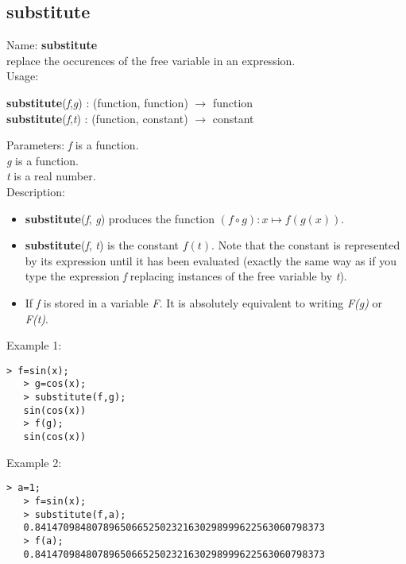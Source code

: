 \subsection{ substitute }
\noindent Name: \textbf{substitute}\\
replace the occurences of the free variable in an expression.\\

\noindent Usage: 
\begin{center}
\textbf{substitute}(\emph{f},\emph{g}) : (\textsf{function}, \textsf{function}) $\rightarrow$ \textsf{function}\\
\textbf{substitute}(\emph{f},\emph{t}) : (\textsf{function}, \textsf{constant}) $\rightarrow$ \textsf{constant}\\
\end{center}
Parameters: 
\emph{f} is a function.\\
\emph{g} is a function.\\
\emph{t} is a real number.\\

\noindent Description: \begin{itemize}

\item \textbf{substitute}(\emph{f}, \emph{g}) produces the function $(f \circ g) : x \mapsto f(g(x))$.

\item \textbf{substitute}(\emph{f}, \emph{t}) is the constant $f(t)$. Note that the constant is
   represented by its expression until it has been evaluated (exactly the same
   way as if you type the expression \emph{f} replacing instances of the free variable 
   by \emph{t}).

\item If \emph{f} is stored in a variable \emph{F}. It is absolutely equivalent to 
   writing \emph{F(g)} or \emph{F(t)}.
\end{itemize}
\noindent Example 1: 
\begin{center}\begin{minipage}{14.8cm}\begin{Verbatim}[frame=single]
   > f=sin(x);
   > g=cos(x);
   > substitute(f,g);
   sin(cos(x))
   > f(g);
   sin(cos(x))
\end{Verbatim}
\end{minipage}\end{center}
\noindent Example 2: 
\begin{center}\begin{minipage}{14.8cm}\begin{Verbatim}[frame=single]
   > a=1;
   > f=sin(x);
   > substitute(f,a);
   0.841470984807896506652502321630298999622563060798373
   > f(a);
   0.841470984807896506652502321630298999622563060798373
\end{Verbatim}
\end{minipage}\end{center}
